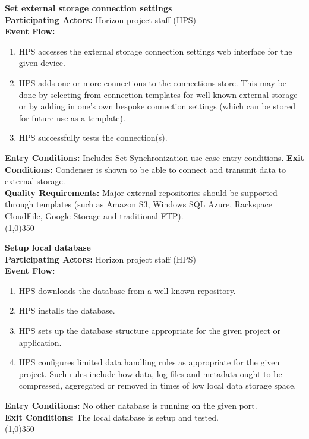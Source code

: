 		\textbf{Set external storage connection settings}\\ 
		\textbf{Participating Actors:}  Horizon project staff (HPS)\\
		\textbf{Event Flow:}
		\begin{enumerate}
\item HPS accesses the external storage connection settings web interface for the given device.
\item HPS adds one or more connections to the connections store. This may be done by selecting from connection templates for well-known external storage or by adding in one's own bespoke connection settings (which can be stored for future use as a template).
\item HPS successfully tests the connection(s).
	    \end{enumerate}
		\textbf{Entry Conditions:} Includes Set Synchronization use case entry conditions.
		\textbf{Exit Conditions:} Condenser is shown to be able to connect and transmit data to external storage.\\
		\textbf{Quality Requirements:} Major external repositories should be supported through templates (such as Amazon S3, Windows SQL Azure, Rackspace CloudFile, Google Storage and traditional FTP).\\
		\line(1,0){350}		
		 
		\textbf{Setup local database} \\		 
		\textbf{Participating Actors:} Horizon project staff (HPS)  \\
		\textbf{Event Flow:}
		\begin{enumerate}
\item HPS downloads the database from a well-known repository.
\item HPS installs the database.
\item HPS sets up the database structure appropriate for the given project or application.
\item HPS configures limited data handling rules as appropriate for the given project. Such rules include how data, log files and metadata ought to be compressed, aggregated or removed in times of low local data storage space.
	    \end{enumerate}
		\textbf{Entry Conditions:} No other database is running on the given port.\\
		\textbf{Exit Conditions:} The local database is setup and tested.\\
		\line(1,0){350}
						 
